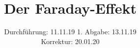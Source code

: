 
\setlength{\parindent}{0 pt}

\subject{V46}
\title{ Der Faraday-Effekt}
\date{%
  Durchführung: 11.11.19
  \hspace{3em}
  1. Abgabe: 13.11.19 \\
  Korrektur: 20.01.20
}



\maketitle
\thispagestyle{empty}
\tableofcontents
\newpage







\printbibliography{}


